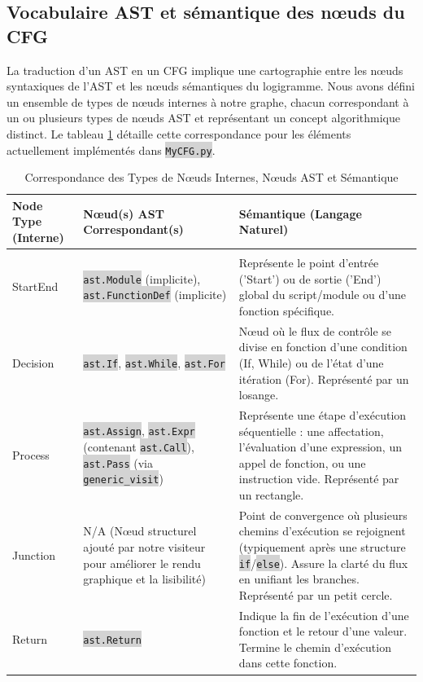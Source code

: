 \documentclass[11pt,a4paper]{article}
\newcommand{\code}[1]{\colorbox{lightgray}{\texttt{\small #1}}}
\begin{document}
\subsection{Vocabulaire AST et sémantique des nœuds du CFG}

La traduction d'un AST en un CFG implique une cartographie entre les nœuds syntaxiques de l'AST et les nœuds sémantiques du logigramme. Nous avons défini un ensemble de types de nœuds internes à notre graphe, chacun correspondant à un ou plusieurs types de nœuds AST et représentant un concept algorithmique distinct. Le tableau \ref{tab:node-types} détaille cette correspondance pour les éléments actuellement implémentés dans \code{MyCFG.py}.

\begin{longtable}{| p{3cm} | p{4cm} | p{8cm} |}
\caption{Correspondance des Types de Nœuds Internes, Nœuds AST et Sémantique}\label{tab:node-types}\\
\hline
\textbf{Node Type (Interne)} & \textbf{Nœud(s) AST Correspondant(s)} & \textbf{Sémantique (Langage Naturel)} \\
\hline
\endfirsthead
\hline
\endfoot
\hline
\multicolumn{3}{r}{\small\slshape Table suite en page suivante} \\
\hline
\endlastfoot
StartEnd & \code{ast.Module} (implicite), \code{ast.FunctionDef} (implicite) & Représente le point d'entrée ('Start') ou de sortie ('End') global du script/module ou d'une fonction spécifique. \\ \hline
Decision & \code{ast.If}, \code{ast.While}, \code{ast.For} & Nœud où le flux de contrôle se divise en fonction d'une condition (If, While) ou de l'état d'une itération (For). Représenté par un losange. \\ \hline
Process & \code{ast.Assign}, \code{ast.Expr} (contenant \code{ast.Call}), \code{ast.Pass} (via \code{generic\_visit}) & Représente une étape d'exécution séquentielle : une affectation, l'évaluation d'une expression, un appel de fonction, ou une instruction vide. Représenté par un rectangle. \\ \hline
Junction & N/A (Nœud structurel ajouté par notre visiteur pour améliorer le rendu graphique et la lisibilité) & Point de convergence où plusieurs chemins d'exécution se rejoignent (typiquement après une structure \code{if}/\code{else}). Assure la clarté du flux en unifiant les branches. Représenté par un petit cercle. \\ \hline
Return & \code{ast.Return} & Indique la fin de l'exécution d'une fonction et le retour d'une valeur. Termine le chemin d'exécution dans cette fonction. \\ \hline

\end{longtable}
\end{document}
